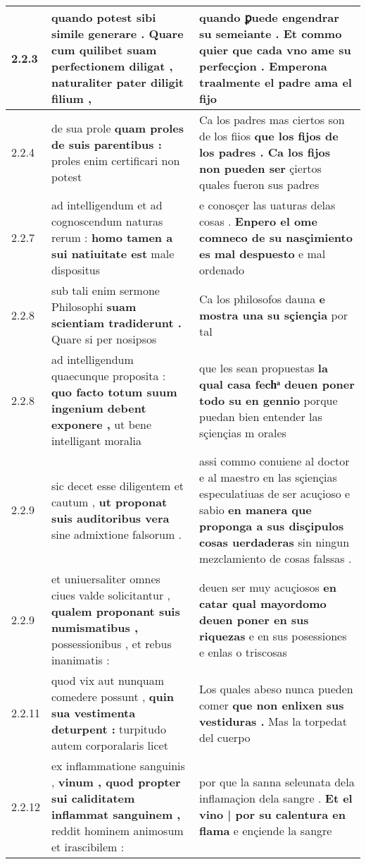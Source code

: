 \begin{tabular}{|p{1cm}|p{6.5cm}|p{6.5cm}|}
2.2.3 & quando potest sibi simile generare . \textbf{ Quare cum quilibet suam perfectionem diligat , } naturaliter pater diligit filium , & quando ꝑuede engendrar su semeiante . \textbf{ Et commo quier que cada vno ame su perfecçion . } Emperona traalmente el padre ama el fijo \\\hline
2.2.4 & de sua prole \textbf{ quam proles de suis parentibus : } proles enim certificari non potest & Ca los padres mas ciertos son de los fiios \textbf{ que los fijos de los padres . Ca los fijos non pueden ser } çiertos quales fueron sus padres \\\hline
2.2.7 & ad intelligendum et ad cognoscendum naturas rerum : \textbf{ homo tamen a sui natiuitate est } male dispositus & e conosçer las uaturas delas cosas . \textbf{ Enpero el ome comneco de su nasçimiento es mal despuesto } e mal ordenado \\\hline
2.2.8 & sub tali enim sermone Philosophi \textbf{ suam scientiam tradiderunt . } Quare si per nosipsos & Ca los philosofos dauna \textbf{ e mostra una su sçiençia } por tal \\\hline
2.2.8 & ad intelligendum quaecunque proposita : \textbf{ quo facto totum suum ingenium debent exponere , } ut bene intelligant moralia & que les sean propuestas \textbf{ la qual casa fechͣ deuen poner todo su en gennio } porque puedan bien entender las sçiençias m orales \\\hline
2.2.9 & sic decet esse diligentem et cautum , \textbf{ ut proponat suis auditoribus vera } sine admixtione falsorum . & assi commo conuiene al doctor e al maestro en las sçiençias especulatiuas de ser acuçioso e sabio \textbf{ en manera que proponga a sus disçipulos cosas uerdaderas } sin ningun mezclamiento de cosas falssas . \\\hline
2.2.9 & et uniuersaliter omnes ciues valde solicitantur , \textbf{ qualem proponant suis numismatibus , } possessionibus , et rebus inanimatis : & deuen ser muy acuçiosos \textbf{ en catar qual mayordomo deuen poner en sus riquezas } e en sus posessiones e enlas o triscosas \\\hline
2.2.11 & quod vix aut nunquam comedere possunt , \textbf{ quin sua vestimenta deturpent : } turpitudo autem corporalaris licet & Los quales abeso nunca pueden comer \textbf{ que non enlixen sus vestiduras . } Mas la torpedat del cuerpo \\\hline
2.2.12 & ex inflammatione sanguinis , \textbf{ vinum , quod propter sui caliditatem inflammat sanguinem , } reddit hominem animosum et irascibilem : & por que la sanna seleunata dela inflamaçion dela sangre . \textbf{ Et el vino | por su calentura en flama } e ençiende la sangre \\\hline

\end{tabular}
